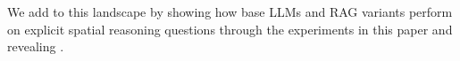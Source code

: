 We add to this landscape by showing how base LLMs and RAG variants perform on explicit spatial reasoning questions through the experiments in this paper and revealing .
 














